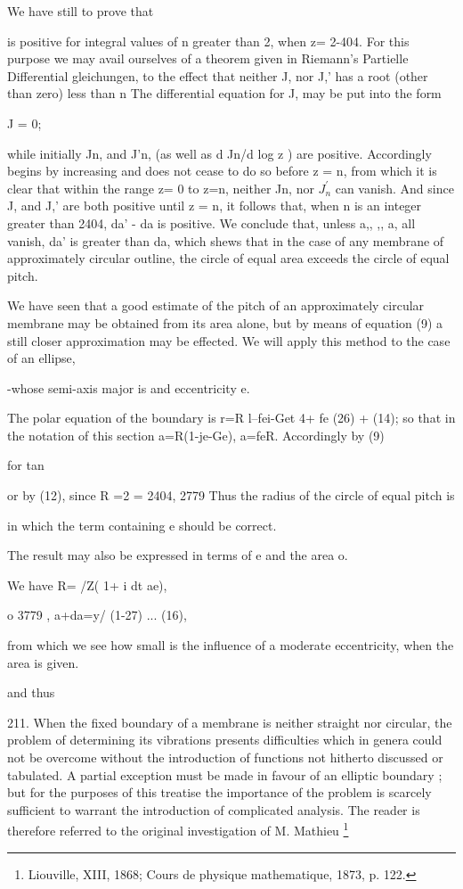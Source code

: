 We have still to prove that

is positive for integral values of n greater than 2, when z= 2-404. For
this purpose we may avail ourselves of a theorem given in Riemann's
Partielle Differential gleichungen, to the effect that neither J, nor
J,' has a root (other than zero) less than n The differential equation
for J, may be put into the form

J = 0;

while initially Jn, and J'n, (as well as d Jn/d log z ) are positive.
Accordingly begins by increasing and does not cease to do so before z =
n, from which it is clear that within the range z= 0 to z=n, neither Jn,
nor \(J_n^{'}\) can vanish. And since J, and J,' are both positive until
z = n, it follows that, when n is an integer greater than 2404, da' - da
is positive. We conclude that, unless a,, ,, a, all vanish, da' is
greater than da, which shews that in the case of any membrane of
approximately circular outline, the circle of equal area exceeds the
circle of equal pitch.

We have seen that a good estimate of the pitch of an approximately
circular membrane may be obtained from its area alone, but by means of
equation (9) a still closer approximation may be effected. We will apply
this method to the case of an ellipse,

-whose semi-axis major is and eccentricity e.

The polar equation of the boundary is r=R l--fei-Get 4+ fe (26) + (14);
so that in the notation of this section a=R(1-je-Ge), a=feR. Accordingly
by (9)

for tan

or by (12), since R =2 = 2404, 2779 Thus the radius of the circle of
equal pitch is

in which the term containing e should be correct.

The result may also be expressed in terms of e and the area o.

We have R= /Z( 1+ i dt ae),

o 3779 , a+da=y/ (1-27) ... (16),

from which we see how small is the influence of a moderate eccentricity,
when the area is given.

and thus

211. When the fixed boundary of a membrane is neither straight nor
circular, the problem of determining its vibrations presents
difficulties which in genera could not be overcome without the
introduction of functions not hitherto discussed or tabulated. A partial
exception must be made in favour of an elliptic boundary ; but for the
purposes of this treatise the importance of the problem is scarcely
sufficient to warrant the introduction of complicated analysis. The
reader is therefore referred to the original investigation of M.
Mathieu
\footnote{Liouville, XIII, 1868; Cours de physique mathematique, 1873, p. 122.}

